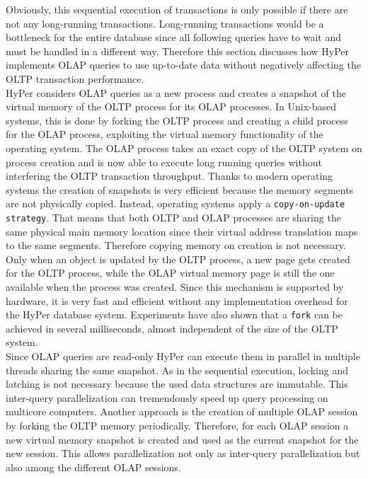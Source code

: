 Obviously, this sequential execution of transactions is only possible if there are not any long-running transactions. Long-running transactions would be a bottleneck for the entire database since all following queries have to wait and must be handled in a different way. Therefore this section discusses how HyPer implements OLAP queries to use up-to-date data without negatively affecting the OLTP transaction performance. 
\\
HyPer considers OLAP queries as a new process and creates a snapshot of the virtual memory of the OLTP process for its OLAP processes. In Unix-based systems, this is done by forking the OLTP process and creating a child process for the OLAP process, exploiting the virtual memory functionality of the operating system. The OLAP process takes an exact copy of the OLTP system on process creation and is now able to execute long running queries without interfering the OLTP transaction throughput. Thanks to modern operating systems the creation of snapshots is very efficient because the memory segments are not physically copied. Instead, operating systems apply a \texttt{copy-on-update strategy}. That means that both OLTP and OLAP processes are sharing the same physical main memory location since their virtual address translation maps to the same segments. Therefore copying memory on creation is not necessary. Only when an object is updated by the OLTP process, a new page gets created for the OLTP process, while the OLAP virtual memory page is still the one available when the process was created. Since this mechanism is supported by hardware, it is very fast and efficient without any implementation overhead for the HyPer database system. Experiments have also shown that a \texttt{fork} can be achieved in several milliseconds, almost independent of the size of the OLTP system.
\\
Since OLAP queries are read-only HyPer can execute them in parallel in multiple threads sharing the same snapshot. As in the sequential execution, locking and latching is not necessary because the used data structures are immutable. This inter-query parallelization can tremendously speed up query processing on multicore computers. Another approach is the creation of multiple OLAP session by forking the OLTP memory periodically. Therefore, for each OLAP session a new virtual memory snapshot is created and used as the current snapshot for the new session. This allows parallelization not only as inter-query parallelization but also among the different OLAP sessions.
\\ 
